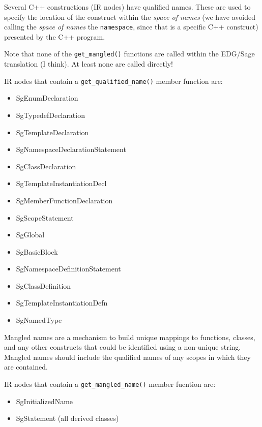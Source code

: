      Several C++ constructions (IR nodes) have qualified names.  These
are used to specify the location of the construct within the {\em space of names}
(we have avoided calling the {\em space of names} the {\tt namespace}, since that
is a specific C++ construct) presented by the C++ program.

     Note that none of the {\tt get\_mangled()} functions are called within the EDG/Sage 
translation (I think).  At least none are called directly!

   IR nodes that contain a {\tt get\_qualified\_name()} member function are:
\begin{itemize}
     \item SgEnumDeclaration
     \item SgTypedefDeclaration
     \item SgTemplateDeclaration
     \item SgNamespaceDeclarationStatement
     \item SgClassDeclaration
     \item SgTemplateInstantiationDecl
     \item SgMemberFunctionDeclaration
     \item SgScopeStatement
     \item SgGlobal
     \item SgBasicBlock
     \item SgNamespaceDefinitionStatement
     \item SgClassDefinition
     \item SgTemplateInstantiationDefn
     \item SgNamedType
\end{itemize}

   Mangled names are a mechanism to build unique mappings to functions, classes,
and any other constructs that could be identified using a non-unique string.
Mangled names should include the qualified names of any scopes in which they
are contained.

   IR nodes that contain a {\tt get\_mangled\_name()} member fucntion are:
\begin{itemize}
     \item SgInitializedName
     \item SgStatement (all derived classes)
\end{itemize}


